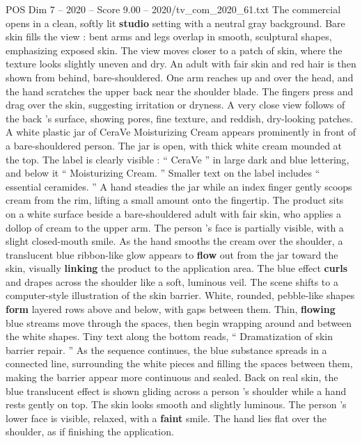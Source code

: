\begin{textsample}{POS Dim 7 – 2020 – Score 9.00 – 2020/tv\_com\_2020\_61.txt}  \label{ex:f7_pos_082}
The commercial opens in a clean, softly lit \textbf{studio} setting with a neutral gray background.
Bare skin fills the view : bent arms and legs overlap in smooth, sculptural shapes, emphasizing exposed skin.
The view moves closer to a patch of skin, where the texture looks slightly uneven and dry.
An adult with fair skin and red hair is then shown from behind, bare-shouldered.
One arm reaches up and over the head, and the hand scratches the upper back near the shoulder blade.
The fingers press and drag over the skin, suggesting irritation or dryness.
A very close view follows of the back ’s surface, showing pores, fine texture, and reddish, dry-looking patches.
A white plastic jar of CeraVe Moisturizing Cream appears prominently in front of a bare-shouldered person.
The jar is open, with thick white cream mounded at the top.
The label is clearly visible : “ CeraVe ” in large dark and blue lettering, and below it “ Moisturizing Cream. ” Smaller text on the label includes “ essential ceramides. ” A hand steadies the jar while an index finger gently scoops cream from the rim, lifting a small amount onto the fingertip.
The product sits on a white surface beside a bare-shouldered adult with fair skin, who applies a dollop of cream to the upper arm.
The person ’s face is partially visible, with a slight closed-mouth smile.
As the hand smooths the cream over the shoulder, a translucent blue ribbon-like glow appears to \textbf{flow} out from the jar toward the skin, visually \textbf{linking} the product to the application area.
The blue effect \textbf{curls} and drapes across the shoulder like a soft, luminous veil.
The scene shifts to a computer-style illustration of the skin barrier.
White, rounded, pebble-like shapes \textbf{form} layered rows above and below, with gaps between them.
Thin, \textbf{flowing} blue streams move through the spaces, then begin wrapping around and between the white shapes.
Tiny text along the bottom reads, “ Dramatization of skin barrier repair. ” As the sequence continues, the blue substance spreads in a connected line, surrounding the white pieces and filling the spaces between them, making the barrier appear more continuous and sealed.
Back on real skin, the blue translucent effect is shown gliding across a person ’s shoulder while a hand rests gently on top.
The skin looks smooth and slightly luminous.
The person ’s lower face is visible, relaxed, with a \textbf{faint} smile.
The hand lies flat over the shoulder, as if finishing the application.

\end{textsample}
